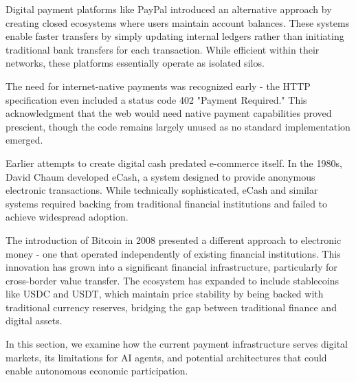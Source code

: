 \documentclass{article}
\begin{document}
Digital payment platforms like PayPal introduced an alternative approach by creating closed ecosystems where users maintain account balances. These systems enable faster transfers by simply updating internal ledgers rather than initiating traditional bank transfers for each transaction. While efficient within their networks, these platforms essentially operate as isolated silos.

The need for internet-native payments was recognized early - the HTTP specification even included a status code 402 "Payment Required." This acknowledgment that the web would need native payment capabilities proved prescient, though the code remains largely unused as no standard implementation emerged.

Earlier attempts to create digital cash predated e-commerce itself. In the 1980s, David Chaum developed eCash, a system designed to provide anonymous electronic transactions. While technically sophisticated, eCash and similar systems required backing from traditional financial institutions and failed to achieve widespread adoption.

The introduction of Bitcoin in 2008 presented a different approach to electronic money - one that operated independently of existing financial institutions. This innovation has grown into a significant financial infrastructure, particularly for cross-border value transfer. The ecosystem has expanded to include stablecoins like USDC and USDT, which maintain price stability by being backed with traditional currency reserves, bridging the gap between traditional finance and digital assets.

In this section, we examine how the current payment infrastructure serves digital markets, its limitations for AI agents, and potential architectures that could enable autonomous economic participation.

    
\end{document}
